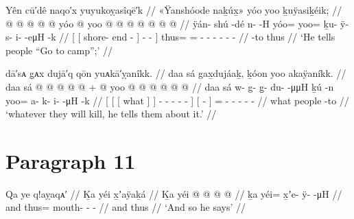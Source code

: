 \ex\label{ex:100-198-tell-to-hunt}%
%
\begingl
	\glpreamble	Yên cū′dê naqo′x yuyukoỵasîqē′k //
	\glpreamble	«\!Ÿanshóode naḵúx̱\!» yóo yoo ḵuÿasiḵéik; //
	\gla	{} {}  @ {} @ {} {} 
			 @ {} @ {} @ {} {}
		yóo @ yoo @  @ {} @ {} @ {} @ {} @ {} @ {} //
	\glb	{} {} ÿán- shú -dé {} 
			n- {}  -H {}
		yóo= yoo= ḵu- ÿ- s- i-  -eμH -k //
	\glc	{}[ {}[ shore- end - {}]
			- \·  - {}]
		thus= = - - - -  - - //
	\gld	{} {}  {} -to {} 
			 {} {} {} {}
		thus   {} {} {} {} {} {} //
	\glft	‘He tells people “Go to camp”;’
		//
\endgl
\xe

\ex\label{ex:100-199-whatever-they-kill}%
%
\begingl
	\glpreamble	dā′sᴀ g̣ᴀx dujā′q qōn yuᴀkā′ỵanîkk. //
	\glpreamble	daa sá gax̱dujáaḵ, ḵóon yoo akaÿaníkk. //
	\gla	{} {} {} daa {} sá {}
			 @ {} @ {} @ {} @ {} @ {} {} +
		{}  @ {} {} 
		yoo @  @ {} @ {} @ {} @ {} @ {} //
	\glb	{} {} {} daa {} sá {} 
			w- g- g̱- du-  -μμH {}
		{} ḵú -n {} 
			yoo= a- k- i-  -μH -k //
	\glc	{}[ {}[ {}[ what {}]  {}]
			- - - -  - {}]
		{}[  - {}]
		= - - -  - - //
	\gld	{} {} {} what {}  {} 
			 {} {} {} {} {} {}
		{} people -to {}
		  {} {} {} {} {} //
	\glft	‘whatever they will kill, he tells them about it.’
		//
\endgl
\xe

\section{Paragraph 11}\label{sec:text-swanton-100-para-11}

\ex\label{ex:100-200-and-he-says}%
%
\begingl
	\glpreamble	Qa ye q!aỵaqᴀ′ //
	\glpreamble	Ḵa yéi x̱ʼaÿaḵá //
	\gla	Ḵa yéi @  @ {} @ {} @ {} //
	\glb	ḵa yéi= x̱ʼe- ÿ-  -μH //
	\glc	and thus= mouth- -  - //
	\gld	and thus  {} {} //
	\glft	‘And so he says’
		//
\endgl
\xe

